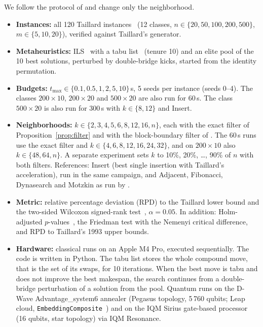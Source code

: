 \documentclass[letterpaper]{article} %
\theoremstyle{definition}
\begin{document}
We follow the protocol of \citet{wojewodzki2026windowed} and change only
the neighborhood.
\begin{itemize}
\item \textbf{Instances:} all 120 Taillard instances~\cite{taillard1993}
      (12 classes, $n\in\{20,50,100,200,500\}$, $m\in\{5,10,20\}$),
      verified against Taillard's generator.
\item \textbf{Metaheuristics:} ILS~\cite{lourenco2003} with a tabu list~\cite{glover1997} (tenure
      10) and an elite pool of the 10 best solutions, perturbed by
      double-bridge kicks, started from the identity permutation.
\item \textbf{Budgets:} $t_{\max}\in\{0.1,0.5,1,2,5,10\}$\,s,
      5 seeds per instance (seeds 0--4). The classes $200\times 10$,
      $200\times 20$ and $500\times 20$ are also run for 60\,s.
      The class $500\times 20$ is also run for 300\,s with $k\in\{8,12\}$
      and Insert.
\item \textbf{Neighborhoods:} $k\in\{2,3,4,5,6,8,12,16,n\}$, each
      with the exact filter of Proposition~\ref{prop:filter} and with the
      block-boundary filter of \citet{wojewodzki2026windowed}. The 60\,s runs use the exact filter and $k\in\{4,6,8,12,16,24,32\}$,
      and on $200\times 10$ also $k\in\{48,64,n\}$. A separate
      experiment sets $k$ to 10\%, 20\%, \dots, 90\% of $n$ with both
      filters. References: Insert (best single insertion with
      Taillard's acceleration), run in the same campaign, and Adjacent,
      Fibonacci, Dynasearch and Motzkin as run by \citet{wojewodzki2026windowed}.
\item \textbf{Metric:} relative percentage deviation (RPD) to the Taillard lower bound and the two-sided
      Wilcoxon signed-rank test~\cite{wilcoxon1945}, $\alpha=0.05$. In addition:
      Holm-adjusted $p$-values~\cite{holm1979}, the Friedman test with the Nemenyi
      critical difference, and RPD to Taillard's 1993 upper bounds.
\item \textbf{Hardware:} classical runs on an Apple M4 Pro, executed
      sequentially. The code is written in Python. The tabu list stores the
      whole compound move, that is the set of its swaps, for 10
      iterations. When the best move is tabu and does not improve the
      best makespan, the search continues from a double-bridge
      perturbation of a solution from the pool. Quantum runs on the
      D-Wave Advantage\_system6 annealer (Pegasus topology, 5\,760
      qubits; Leap cloud, \texttt{EmbeddingComposite}~\cite{choi2008minor}) and on the IQM
      Sirius gate-based processor (16 qubits, star topology) via IQM
      Resonance.
\end{itemize}
\end{document}
